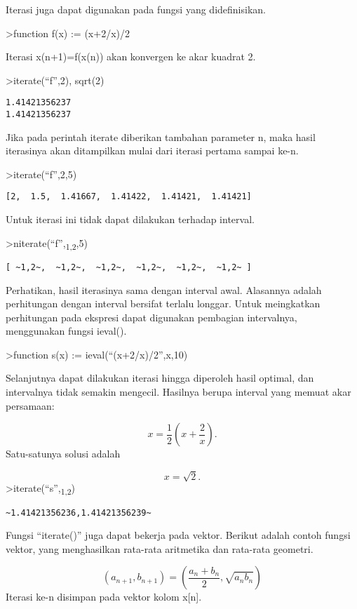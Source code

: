 \documentclass[
]{book}
\begin{document}
Iterasi juga dapat digunakan pada fungsi yang didefinisikan.

\textgreater function f(x) := (x+2/x)/2

Iterasi x(n+1)=f(x(n)) akan konvergen ke akar kuadrat 2.

\textgreater iterate(``f'',2), sqrt(2)

\begin{verbatim}
1.41421356237
1.41421356237
\end{verbatim}

Jika pada perintah iterate diberikan tambahan parameter n, maka hasil iterasinya akan ditampilkan mulai dari iterasi pertama sampai ke-n.

\textgreater iterate(``f'',2,5)

\begin{verbatim}
[2,  1.5,  1.41667,  1.41422,  1.41421,  1.41421]
\end{verbatim}

Untuk iterasi ini tidak dapat dilakukan terhadap interval.

\textgreater niterate(``f'',\textsubscript{1,2},5)

\begin{verbatim}
[ ~1,2~,  ~1,2~,  ~1,2~,  ~1,2~,  ~1,2~,  ~1,2~ ]
\end{verbatim}

Perhatikan, hasil iterasinya sama dengan interval awal. Alasannya adalah perhitungan dengan interval bersifat terlalu longgar. Untuk meingkatkan perhitungan pada ekspresi dapat digunakan pembagian intervalnya, menggunakan fungsi ieval().

\textgreater function s(x) := ieval(``(x+2/x)/2'',x,10)

Selanjutnya dapat dilakukan iterasi hingga diperoleh hasil optimal, dan intervalnya tidak semakin mengecil. Hasilnya berupa interval yang memuat akar persamaan:

\[x = \frac{1}{2} \left( x + \frac{2}{x} \right).\]Satu-satunya solusi adalah

\[x = \sqrt2.\]\textgreater iterate(``s'',\textsubscript{1,2})

\begin{verbatim}
~1.41421356236,1.41421356239~
\end{verbatim}

Fungsi ``iterate()'' juga dapat bekerja pada vektor. Berikut adalah contoh fungsi vektor, yang menghasilkan rata-rata aritmetika dan rata-rata geometri.

\[(a_{n+1},b_{n+1}) = \left( \frac{a_n+b_n}{2}, \sqrt{a_nb_n} \right)\]Iterasi ke-n disimpan pada vektor kolom x{[}n{]}.
\end{document}
